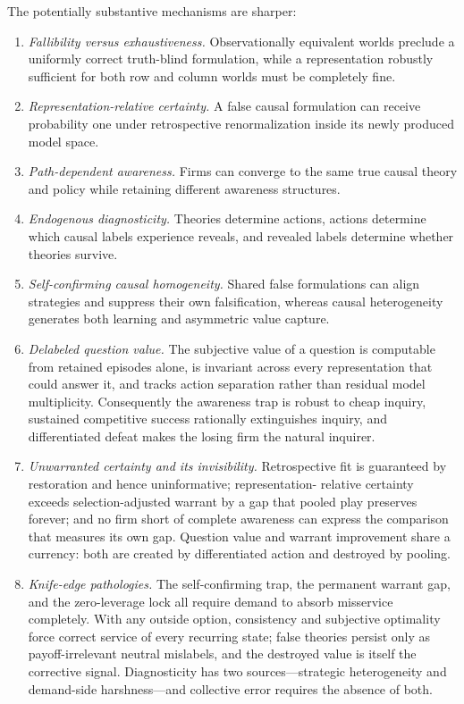 \documentclass[11pt]{article}
\begin{document}
The potentially substantive mechanisms are sharper:
\begin{enumerate}[label=(\roman*)]
  \item \emph{Fallibility versus exhaustiveness.}  Observationally equivalent
  worlds preclude a uniformly correct truth-blind formulation, while a
  representation robustly sufficient for both row and column worlds must be
  completely fine.
  \item \emph{Representation-relative certainty.}  A false causal formulation
  can receive probability one under retrospective renormalization inside its
  newly produced model space.
  \item \emph{Path-dependent awareness.}  Firms can converge to the same true
  causal theory and policy while retaining different awareness structures.
  \item \emph{Endogenous diagnosticity.}  Theories determine actions, actions
  determine which causal labels experience reveals, and revealed labels
  determine whether theories survive.
  \item \emph{Self-confirming causal homogeneity.}  Shared false formulations
  can align strategies and suppress their own falsification, whereas causal
  heterogeneity generates both learning and asymmetric value capture.
  \item \emph{Delabeled question value.}  The subjective value of a question
  is computable from retained episodes alone, is invariant across every
  representation that could answer it, and tracks action separation rather
  than residual model multiplicity.  Consequently the awareness trap is robust
  to cheap inquiry, sustained competitive success rationally extinguishes
  inquiry, and differentiated defeat makes the losing firm the natural
  inquirer.
  \item \emph{Unwarranted certainty and its invisibility.}  Retrospective fit
  is guaranteed by restoration and hence uninformative; representation-
  relative certainty exceeds selection-adjusted warrant by a gap that pooled
  play preserves forever; and no firm short of complete awareness can express
  the comparison that measures its own gap.  Question value and warrant
  improvement share a currency: both are created by differentiated action and
  destroyed by pooling.
  \item \emph{Knife-edge pathologies.}  The self-confirming trap, the
  permanent warrant gap, and the zero-leverage lock all require demand to
  absorb misservice completely.  With any outside option, consistency and
  subjective optimality force correct service of every recurring state; false
  theories persist only as payoff-irrelevant neutral mislabels, and the
  destroyed value is itself the corrective signal.  Diagnosticity has two
  sources---strategic heterogeneity and demand-side harshness---and collective
  error requires the absence of both.
\end{enumerate}
\end{document}

